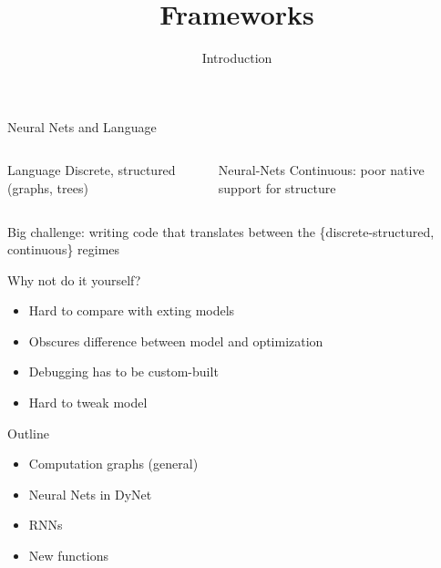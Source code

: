 \documentclass[compress]{beamer}
\title{Frameworks}
\date{Introduction}
\begin{document}



\begin{frame}{Neural Nets and Language}

\begin{columns}
  \begin{block}{Language}
    Discrete, structured (graphs, trees)
  \end{block}
  \begin{block}{Neural-Nets}
    Continuous: poor native support for structure
  \end{block}
\end{columns}

Big challenge: writing code that translates between the \{discrete-structured, continuous\} regimes

\end{frame}


\begin{frame}{Why not do it yourself?}

\begin{itemize}
  \item Hard to compare with exting models
  \item Obscures difference between model and optimization
  \item Debugging has to be custom-built
  \item Hard to tweak model
\end{itemize}

\end{frame}

\begin{frame}{Outline}
\begin{itemize}
\item Computation graphs (general)
\item Neural Nets in DyNet
\item RNNs
\item New functions
\end{itemize}

\end{frame}
\end{document}

